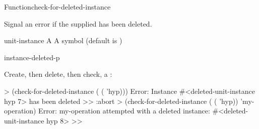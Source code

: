 \documentclass[10pt,twoside,english,pdftex]{article}
\begin{document}
\begin{functiondoc}{Function}{check-for-deleted-instance}{%
    }

\fnsyntax

\fnpurpose Signal an error if the supplied  has been
deleted.

\fnpackage {}

\fnmodule {}

\fnargs
\begin{args}{unit-instance}
 A 
\arg[operation] A symbol (default is \nil)
\end{args}

\begin{alsos}{instance-deleted-p}
\end{alsos}

\fnexamples
{}%
%
Create, then delete, then check, a  :
%
\W\supp
\begin{example}
  > (check-for-deleted-instance ( ( 'hyp)))
  Error: Instance #<deleted-unit-instance hyp 7> has been deleted
  >> :abort
  > (check-for-deleted-instance ( ( 'hyp))
                                'my-operation)
  Error: my-operation attempted with a deleted instance: #<deleted-unit-instance hyp 8>
  >>
\end{example}

\end{functiondoc}

\end{document}
